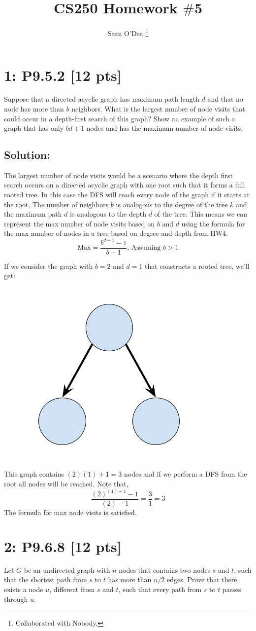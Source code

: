 \documentclass[12pt]{article}
\title{CS250 Homework $\#$5}
\author{Sean O'Dea \footnote{Collaborated with Nobody.}}
\begin{document}
\maketitle

\section*{\textbf{1: P9.5.2} [12 pts]}
Suppose that a directed acyclic graph has maximum path length $d$ and that no node has more than $b$ neighbors. What is the largest number of node visits that could occur in a depth-first search of this graph? Show an example of such a graph that has only $bd + 1$ nodes and has the maximum number of node visits.


\subsection*{\textbf{Solution:}}
The largest number of node visits would be a scenario where the depth first search occurs on a directed acyclic graph with one root such that it forms a full rooted tree. In this case the DFS will reach every node of the graph if it starts at the root. The number of neighbors $b$ is analogous to the degree of the tree $k$ and the maximum path $d$ is analogous to the depth $d$ of the tree. This means we can represent the max number of node visits based on $b$ and $d$ using the formula for the max number of nodes in a tree based on degree and depth from HW4.
\[ \text{Max} = \dfrac{b^{d+1} - 1}{b-1} \text{, Assuming } b > 1 \] 

\noindent
If we consider the graph with $b=2$ and $d=1$ that constructs a rooted tree, we'll get:
\begin{figure}[h]
    \centering
    \includegraphics[width=0.25\linewidth]{graph.png}
\end{figure}

\noindent
This graph contains $(2)(1) + 1 = 3$ nodes and if we perform a DFS from the root all nodes will be reached. Note that,
\[ \dfrac{(2)^{(1)+1} - 1}{(2)-1} = \dfrac{3}{1} = 3\]
The formula for max node visits is satisfied.

\newpage
\section*{\textbf{2: P9.6.8} [12 pts]}
Let $G$ be an undirected graph with $n$ nodes that contains two nodes $s$ and $t$, such that the shortest path from $s$ to $t$ has more than $n/2$ edges. Prove that there exists a node $u$, different from $s$ and $t$, such that every path from $s$ to $t$ passes through $u$.
\end{document}
